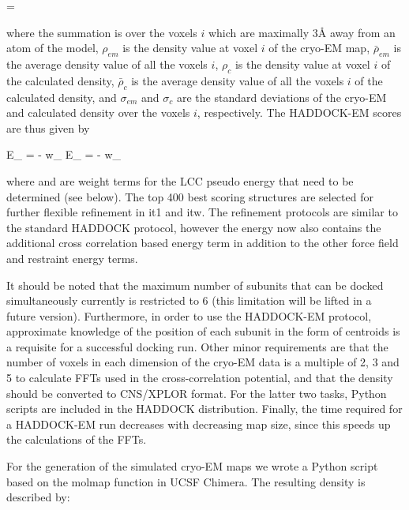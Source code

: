\startformula
{} = 
\stopformula

where the summation is over the voxels $i$ which are maximally 3Å away from an
atom of the model, $\rho_{em}$ is the density value at voxel $i$ of the cryo-EM
map, $\bar{\rho}_{em}$ is the average density value of all the voxels $i$,
$\rho_c$ is the density value at voxel $i$ of the calculated density,
$\bar{\rho}_c$ is the average density value of all the voxels $i$ of the
calculated density, and $\sigma_{em}$ and $\sigma_c$ are the standard
deviations of the cryo-EM and calculated density over the voxels $i$,
respectively.  The HADDOCK-EM scores are thus given by

\placeformula[eq:haddock-em-it0]
\startformula
E_{} = \Eitr - w_{} \cdot {}
\stopformula
{}
\startformula
E_{} = \Eitf - w_{} \cdot {}
\stopformula

where  and  are weight terms for the LCC
pseudo energy that need to be determined (see below). The top 400 best scoring
structures are selected for further flexible refinement in it1 and itw.  The
refinement protocols are similar to the standard HADDOCK protocol, however the
energy now also contains the additional cross correlation based energy term in
addition to the other force field and restraint energy terms. 

It should be noted that the maximum number of subunits that can be docked
simultaneously currently is restricted to 6 (this limitation will be lifted in
a future version).  Furthermore, in order to use the HADDOCK-EM protocol,
approximate knowledge of the position of each subunit in the form of centroids
is a requisite for a successful docking run.  Other minor requirements are that
the number of voxels in each dimension of the cryo-EM data is a multiple of 2,
3 and 5 to calculate FFTs used in the cross-correlation potential, and that the
density should be converted to CNS/XPLOR format.  For the latter two tasks,
Python scripts are included in the HADDOCK distribution.  Finally, the time
required for a HADDOCK-EM run decreases with decreasing map size, since this
speeds up the calculations of the FFTs.



For the generation of the simulated cryo-EM maps we wrote a Python script based
on the molmap function in UCSF Chimera. The resulting density is described by:

